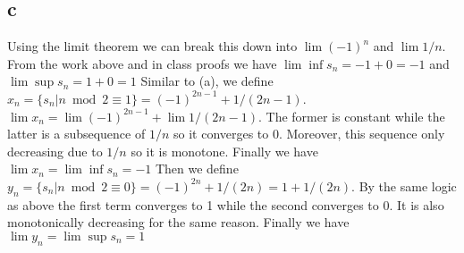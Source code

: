 \documentclass[12pt]{article}
\begin{document}
\subsection{c}
Using the limit theorem we can break this down into $\lim (-1)^n$ and $\lim 1/n$. From the work above and in class proofs we have $\lim \inf s_n = -1 + 0 = -1$ and $\lim \sup s_n = 1 + 0 = 1$
\newline
Similar to (a), we define $x_n = \{ s_n | n \bmod 2 \equiv 1\} = (-1)^{2n-1} + 1/(2n-1)$. $\lim x_n = \lim (-1)^{2n-1} + \lim 1/(2n-1)$. The former is constant while the latter is a subsequence of $1/n$ so it converges to 0. Moreover, this sequence only decreasing due to $1/n$ so it is monotone. Finally we have $\lim x_n = \lim \inf s_n = -1$
\newline
Then we define $y_n = \{ s_n | n \bmod 2 \equiv 0\} = (-1)^{2n} + 1/(2n) = 1+1/(2n)$. By the same logic as above the first term converges to 1 while the second converges to 0. It is also monotonically decreasing for the same reason. Finally we have $\lim y_n = \lim \sup s_n = 1$
\end{document}
